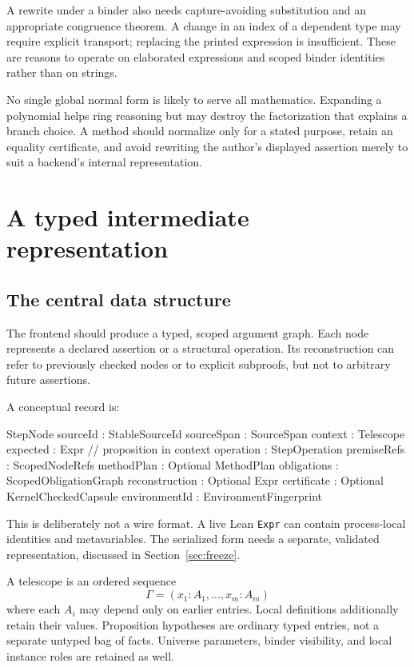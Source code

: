 \documentclass[11pt,a4paper]{article}
\theoremstyle{remark}
\newcommand{\ty}[1]{\texttt{#1}}
\begin{document}
A rewrite under a binder also needs capture-avoiding substitution and an appropriate congruence theorem. A change in an index of a dependent type may require explicit transport; replacing the printed expression is insufficient. These are reasons to operate on elaborated expressions and scoped binder identities rather than on strings.

No single global normal form is likely to serve all mathematics. Expanding a polynomial helps ring reasoning but may destroy the factorization that explains a branch choice. A method should normalize only for a stated purpose, retain an equality certificate, and avoid rewriting the author's displayed assertion merely to suit a backend's internal representation.

\section{A typed intermediate representation}\label{sec:ir}

\subsection{The central data structure}
The frontend should produce a typed, scoped argument graph. Each node represents a declared assertion or a structural operation. Its reconstruction can refer to previously checked nodes or to explicit subproofs, but not to arbitrary future assertions.

A conceptual record is:
\Needspace{178pt}
\begin{code}
StepNode {
  sourceId        : StableSourceId
  sourceSpan      : SourceSpan
  context         : Telescope
  expected        : Expr              // proposition in context
  operation       : StepOperation
  premiseRefs     : ScopedNodeRefs
  methodPlan      : Optional MethodPlan
  obligations     : ScopedObligationGraph
  reconstruction  : Optional Expr
  certificate     : Optional KernelCheckedCapsule
  environmentId   : EnvironmentFingerprint
}
\end{code}
This is deliberately not a wire format. A live Lean \ty{Expr} can contain process-local identities and metavariables. The serialized form needs a separate, validated representation, discussed in Section~\ref{sec:freeze}.

A telescope is an ordered sequence
\[
\Gamma=(x_1:A_1,\ldots,x_m:A_m)
\]
where each $A_i$ may depend only on earlier entries. Local definitions additionally retain their values. Proposition hypotheses are ordinary typed entries, not a separate untyped bag of facts. Universe parameters, binder visibility, and local instance roles are retained as well.
\end{document}
